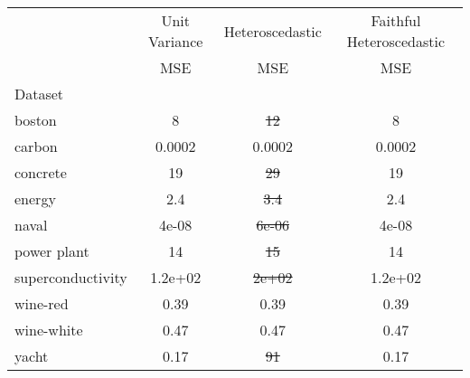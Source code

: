 \begin{tabular}{l|c|c|c}
\toprule
{} & {Unit Variance} & {Heteroscedastic} & {Faithful Heteroscedastic} \\
{} & {MSE} & {MSE} & {MSE} \\
{Dataset} & {} & {} & {} \\
\midrule
boston & 8 & \sout{12} & 8 \\
carbon & 0.0002 & 0.0002 & 0.0002 \\
concrete & 19 & \sout{29} & 19 \\
energy & 2.4 & \sout{3.4} & 2.4 \\
naval & 4e-08 & \sout{6e-06} & 4e-08 \\
power plant & 14 & \sout{15} & 14 \\
superconductivity & 1.2e+02 & \sout{2e+02} & 1.2e+02 \\
wine-red & 0.39 & 0.39 & 0.39 \\
wine-white & 0.47 & 0.47 & 0.47 \\
yacht & 0.17 & \sout{91} & 0.17 \\
\bottomrule
\end{tabular}
